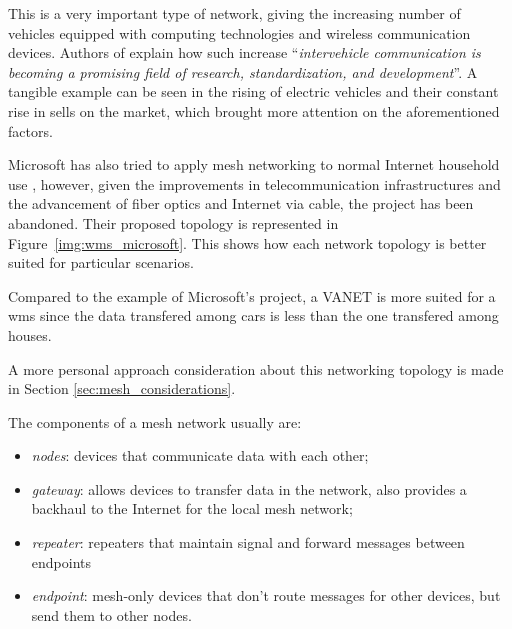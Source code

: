 		This is a very important type of network, giving the increasing number of vehicles equipped with computing technologies and wireless communication devices.
		Authors of \cite{BADIS2015653} explain how such increase ``\textit{intervehicle communication is becoming a promising field of research, standardization, and development}''.
		A tangible example can be seen in the rising of electric vehicles and their constant rise in sells on the market, which brought more attention on the aforementioned factors.
		
		Microsoft has also tried to apply mesh networking to normal Internet household use \cite{bahl2009opportunistic}, however, given the improvements in telecommunication infrastructures and the advancement of fiber optics and Internet via cable, the project has been abandoned.
		Their proposed topology is represented in Figure~\ref{img:wms_microsoft}.
		This shows how each network topology is better suited for particular scenarios.
		
		Compared to the example of Microsoft's project, a VANET is more suited for a wms since the data transfered among cars is less than the one transfered among houses.
		
		A more personal approach consideration about this networking topology is made in Section \ref{sec:mesh_considerations}.
				
		
		The components of a mesh network usually are:
		\begin{itemize}
			\item \textit{nodes}: devices that communicate data with each other;
			\item \textit{gateway}: allows devices to transfer data in the network, also provides a backhaul to the Internet for the local mesh network;
			\item \textit{repeater}: repeaters that maintain signal and forward messages between endpoints
			\item \textit{endpoint}: mesh-only devices that don't route messages for other devices, but send them to other nodes.
		\end{itemize}
		\vspace*{-\baselineskip}

